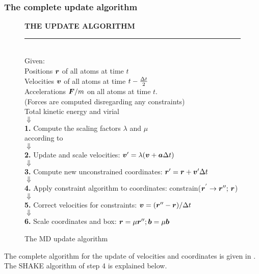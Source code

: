 \subsubsection*{The complete update algorithm}
\begin{figure}
\begin{center}
\addtolength{\fboxsep}{0.5cm}
\begin{shadowenv}[12cm]
{\large \bf THE UPDATE ALGORITHM}
\rule{\textwidth}{2pt} \\
Given:\\
Positions $\mbox{\boldmath ${r}$}$ of all atoms at time $t$ \\
Velocities $\mbox{\boldmath ${v}$}$ of all atoms at time $t-{\frac {\Delta t}{2}}$ \\
Accelerations $\mbox{\boldmath ${F}$}/m$ on all atoms at time $t$.\\
(Forces are computed disregarding any constraints)\\
Total kinetic energy and virial \\
$\Downarrow$ \\
{\bf 1.} Compute the scaling factors $\lambda$ and $\mu$\\
according to \\   
$\Downarrow$ \\
{\bf 2.} Update and scale velocities: $\mbox{\boldmath ${v}$}' =  \lambda (\mbox{\boldmath ${v}$} +
\mbox{\boldmath ${a}$} \Delta t)$ \\
$\Downarrow$ \\
{\bf 3.} Compute new unconstrained coordinates: $\mbox{\boldmath ${r}$}' = \mbox{\boldmath ${r}$} + \mbox{\boldmath ${v}$}'
\Delta t$ \\
$\Downarrow$ \\
{\bf 4.} Apply constraint algorithm to coordinates: constrain($\mbox{\boldmath ${r}$}^{'} \rightarrow  \mbox{\boldmath ${r}$}'';
\,  \mbox{\boldmath ${r}$}$) \\
$\Downarrow$ \\
{\bf 5.} Correct velocities for constraints: $\mbox{\boldmath ${v}$} = (\mbox{\boldmath ${r}$}'' -
\mbox{\boldmath ${r}$}) / \Delta t$ \\
$\Downarrow$ \\
{\bf 6.} Scale coordinates and box: $\mbox{\boldmath ${r}$} = \mu \mbox{\boldmath ${r}$}''; \mbox{\boldmath ${b}$} =
\mu  \mbox{\boldmath ${b}$}$ \\
\end{shadowenv}
\caption{The MD update algorithm}
\label{fig:complete-update}
\end{center}
\end{figure}
The complete algorithm for the update of velocities and coordinates is
given in . The SHAKE algorithm of step
4 is explained below. 

